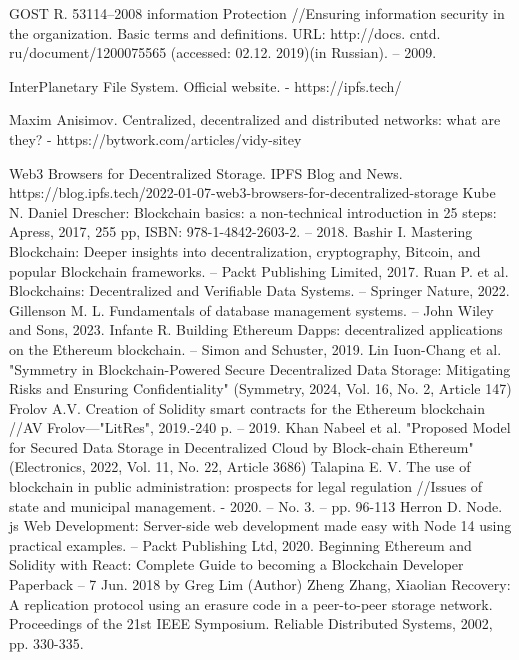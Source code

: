 \documentclass[10pt,conference,a4paper]{IEEEtran_EDM}
\begin{document}
\begin{thebibliography}{00}

 GOST R. 53114–2008 information Protection //Ensuring information security in the organization. Basic terms and definitions. URL: http://docs. cntd. ru/document/1200075565 (accessed: 02.12. 2019)(in Russian). – 2009.

 InterPlanetary File System. Official website. - https://ipfs.tech/

 Maxim Anisimov. Centralized, decentralized and distributed networks: what are they? - https://bytwork.com/articles/vidy-sitey

 Web3 Browsers for Decentralized Storage. IPFS Blog and News. https://blog.ipfs.tech/2022-01-07-web3-browsers-for-decentralized-storage
 Kube N. Daniel Drescher: Blockchain basics: a non-technical introduction in 25 steps: Apress, 2017, 255 pp, ISBN: 978-1-4842-2603-2. – 2018.
 Bashir I. Mastering Blockchain: Deeper insights into decentralization, cryptography, Bitcoin, and popular Blockchain frameworks. – Packt Publishing Limited, 2017.
 Ruan P. et al. Blockchains: Decentralized and Verifiable Data Systems. – Springer Nature, 2022.
 Gillenson M. L. Fundamentals of database management systems. – John Wiley and Sons, 2023.
 Infante R. Building Ethereum Dapps: decentralized applications on the Ethereum blockchain. – Simon and Schuster, 2019.
 Lin Iuon-Chang et al. "Symmetry in Blockchain-Powered Secure Decentralized Data Storage: Mitigating Risks and Ensuring Confidentiality" (Symmetry, 2024, Vol. 16, No. 2, Article 147) 
 Frolov A.V. Creation of Solidity smart contracts for the Ethereum blockchain //AV Frolov—"LitRes", 2019.-240 p. – 2019.
 Khan Nabeel et al. "Proposed Model for Secured Data Storage in Decentralized Cloud by Block-chain Ethereum" (Electronics, 2022, Vol. 11, No. 22, Article 3686)  
 Talapina E. V. The use of blockchain in public administration: prospects for legal regulation //Issues of state and municipal management. - 2020. – No. 3. – pp. 96-113
 Herron D. Node. js Web Development: Server-side web development made easy with Node 14 using practical examples. – Packt Publishing Ltd, 2020.
 Beginning Ethereum and Solidity with React: Complete Guide to becoming a Blockchain Developer Paperback – 7 Jun. 2018 by Greg Lim (Author)
 Zheng Zhang, Xiaolian Recovery: A replication protocol using an erasure code in a peer-to-peer storage network. Proceedings of the 21st IEEE Symposium. Reliable Distributed Systems, 2002, pp. 330-335.

\end{thebibliography}
\end{document}
